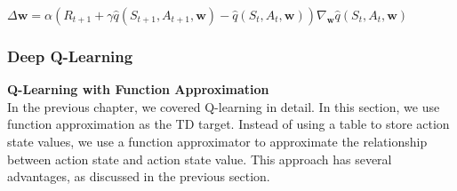 \documentclass{article}
\begin{document}
\hspace*{\fill}

$\Delta \mathbf{w}=\alpha\left(R_{t+1}+\gamma \hat{q}\left(S_{t+1}, A_{t+1}, \mathbf{w}\right)-\hat{q}\left(S_t, A_t, \mathbf{w}\right)\right) \nabla_{\mathbf{w}} \hat{q}\left(S_t, A_t, \mathbf{w}\right)$\\



\begin{comment}
\begin{algorithm}
  \caption{Q-learning with function approximation (on-policy version)}\label{alg:policy_search}
  \begin{algorithmic}
    \State  Initial parameter vector $w_0$, Initial policy $\pi_0$, Small $\epsilon > 0$.
    \State  Search a good policy that can lead the agent to the target from an initial state-action pair $(s_0, a_0)$.
    \For{each episode}
        \State Take action $a_t$ following $\pi_t(s_t)$, and generate $r_{t+1}$, $s_{t+1}$
        \State \textbf{Value update (parameter update):}
        \State $w_{t+1}=w_t+\alpha_t[r_{t+1}+\gamma \max _{a \in \mathcal{A}(s_{t+1})} \hat{q}(s_{t+1}, a, w_t)- $
        \State  $\hat{q}(s_t, a_t, w_t)] \nabla_w \hat{q}(s_t, a_t, w_t)$
        \State \textbf{Policy update:}
        \State $\pi_{t+1}(a \mid s_t)=1-\frac{\varepsilon}{|\mathcal{A}(s)|}(|\mathcal{A}(s)|-1) \text { if } a= \arg \max _{a \in \mathcal{A}(s_t)} \hat{q}(s_t, a, w_{t+1}) $
        \State $\pi_{t+1}(a \mid s_t)=\frac{\varepsilon}{|\mathcal{A}(s)|} \text { otherwise }$
    \EndFor
  \end{algorithmic}
\end{algorithm}
\end{comment}

\newpage
\subsubsection{Deep Q-Learning}

\noindent
\textbf{Q-Learning with Function Approximation}\\
\noindent
In the previous chapter, we covered Q-learning in detail. In this section, we use function approximation as the TD target. Instead of using a table to store action state values, we use a function approximator to approximate the relationship between action state and action state value. This approach has several advantages, as discussed in the previous section.
\end{document}
